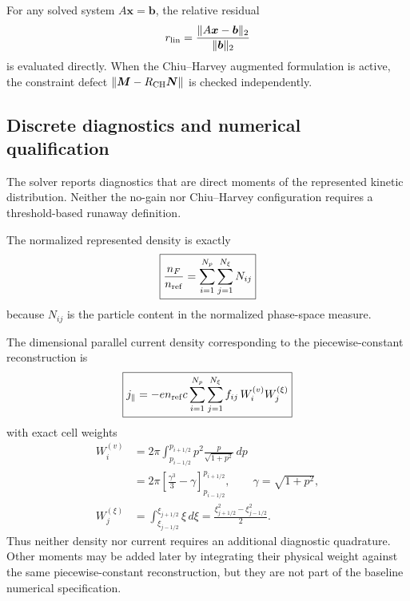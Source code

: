 \documentclass[11pt]{article}
\begin{document}
For any solved system $A\bm x=\bm b$, the relative residual
\begin{equation}
 r_{\rm lin}=\frac{\|A\bm x-\bm b\|_2}{\|\bm b\|_2}
 \label{eq:linear_residual}
\end{equation}
is evaluated directly.  When the Chiu--Harvey augmented formulation is active, the
constraint defect $\|\bm M-R_{\rm CH}\bm N\|$ is checked independently.

\subsection{Discrete diagnostics and numerical qualification}

The solver reports diagnostics that are direct moments of the represented kinetic
distribution.  Neither the no-gain nor Chiu--Harvey configuration requires a
threshold-based runaway definition.

The normalized represented density is exactly
\begin{equation}
 \boxed{
 \frac{n_F}{n_{\rm ref}}=\sum_{i=1}^{N_p}\sum_{j=1}^{N_\xi}N_{ij}
 }
 \label{eq:discrete_density}
\end{equation}
because $N_{ij}$ is the particle content in the normalized phase-space measure.

The dimensional parallel current density corresponding to the piecewise-constant
reconstruction is
\begin{equation}
 \boxed{
 j_\parallel
 =-e n_{\rm ref}c
 \sum_{i=1}^{N_p}\sum_{j=1}^{N_\xi}
 f_{ij}\,W_i^{(v)}W_j^{(\xi)}
 }
 \label{eq:discrete_current}
\end{equation}
with exact cell weights
\begin{align}
 W_i^{(v)}
 &=2\pi\int_{p_{i-1/2}}^{p_{i+1/2}}
       p^2\frac{p}{\sqrt{1+p^2}}\,dp
 \nonumber\\
 &=2\pi\left[
       \frac{\gamma^3}{3}-\gamma
       \right]_{p_{i-1/2}}^{p_{i+1/2}},
 \qquad \gamma=\sqrt{1+p^2},
 \label{eq:current_radial_weight}\\
 W_j^{(\xi)}
 &=\int_{\xi_{j-1/2}}^{\xi_{j+1/2}}\xi\,d\xi
 =\frac{\xi_{j+1/2}^2-\xi_{j-1/2}^2}{2}.
 \label{eq:current_pitch_weight}
\end{align}
Thus neither density nor current requires an additional diagnostic quadrature.  Other
moments may be added later by integrating their physical weight against the same
piecewise-constant reconstruction, but they are not part of the baseline numerical
specification.
\end{document}
